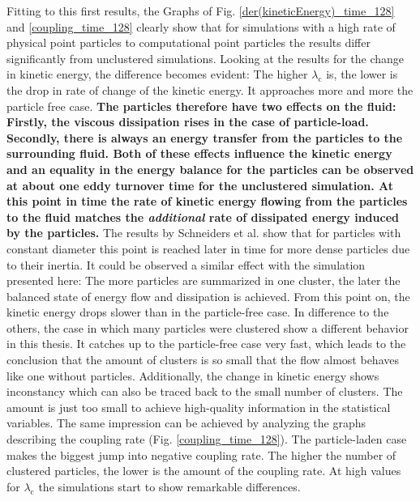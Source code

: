 \documentclass[11pt,a4paper,openany,oneside,parskip=half*]{article}
\begin{document}
\newline
Fitting to this first results, the Graphs of Fig. \ref{der(kineticEnergy)_time_128} and \ref{coupling_time_128} clearly show that for simulations with a high rate of physical point particles to computational point particles the results differ significantly from unclustered simulations. Looking at the results for the change in kinetic energy, the difference becomes evident: The higher $\lambda_\mathrm{c}$ is, the lower is the drop in rate of change of the kinetic energy. It approaches more and more the particle free case. 
\newline
\textbf{The particles therefore have two effects on the fluid: Firstly, the viscous dissipation rises in the case of particle-load. Secondly, there is always an energy transfer from the particles to the surrounding fluid. Both of these effects influence the kinetic energy and an equality in the energy balance for the particles can be observed at about one eddy turnover time for the unclustered simulation. At this point in time the rate of kinetic energy flowing from the particles to the fluid matches the \textit{additional} rate of dissipated energy induced by the particles.}
\newline
The results by Schneiders et al. \cite{Schneiders2017} show that for particles with constant diameter this point is reached later in time for more dense particles due to their inertia. It could be observed a similar effect with the simulation presented here: The more particles are summarized in one cluster, the later the balanced state of energy flow and dissipation is achieved. From this point on, the kinetic energy drops slower than in the particle-free case.
\newline
In difference to the others, the case in which many particles were clustered show a different behavior in this thesis. It catches up to the particle-free case very fast, which leads to the conclusion that the amount of clusters is so small that the flow almost behaves like one without particles. Additionally, the change in kinetic energy shows inconstancy which can also be traced back to the small number of clusters. The amount is just too small to achieve high-quality information in the statistical variables. 
\newline
The same impression can be achieved by analyzing the graphs describing the coupling rate (Fig. \ref{coupling_time_128}). The particle-laden case makes the biggest jump into negative coupling rate. The higher the number of clustered particles, the lower is the amount of the coupling rate. At high values for $\lambda_\mathrm{c}$ the simulations start to show remarkable differences. 
\end{document}
